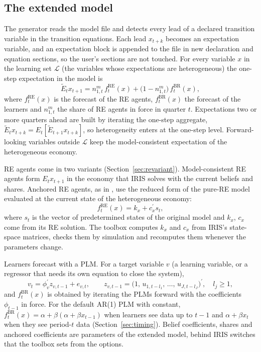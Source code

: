 \documentclass[pdflatex,sn-basic]{sn-jnl}
\DeclareRobustCommand{\code}[1]{\texttt{\detokenize{#1}}}
\newcommand{\RE}{\mathrm{RE}}
\newcommand{\BR}{\mathrm{BR}}
\newcommand{\fRE}{f^{\RE}}
\newcommand{\fBR}{f^{\BR}}
\newcommand{\Eagg}{\tilde{E}}
\newcommand{\transp}{^{\prime}}
\begin{document}
\subsection{The extended model}\label{sec:extended}

The generator reads the model file and detects every lead of a declared transition variable in
the transition equations. Each lead $x_{t+k}$ becomes an expectation variable, and an
expectation block is appended to the file in new declaration and equation sections, so the
user's sections are not touched. For every variable $x$ in the learning set $\mathcal{L}$ (the
variables whose expectations are heterogeneous) the one-step expectation in the model is
\begin{equation}\label{eq:agg}
  \Eagg_t x_{t+1} = n^{m}_{1,t}\,\fRE_t(x) + \bigl(1-n^{m}_{1,t}\bigr)\,\fBR_t(x),
\end{equation}
where $\fRE_t(x)$ is the forecast of the RE agents, $\fBR_t(x)$ the forecast of the learners and
$n^{m}_{1,t}$ the share of RE agents in force in quarter $t$. Expectations two or more quarters
ahead are built by iterating the one-step aggregate, $\Eagg_t x_{t+k} = E_t[\Eagg_{t+1}
x_{t+k}]$, so heterogeneity enters at the one-step level. Forward-looking variables outside
$\mathcal{L}$ keep the model-consistent expectation of the heterogeneous economy.

RE agents come in two variants (Section~\ref{sec:revariant}). Model-consistent RE agents form
$E_t x_{t+1}$ in the economy that IRIS solves with the current beliefs and shares. Anchored RE
agents, as in \citet{ozden2025}, use the reduced form of the pure-RE model evaluated at the
current state of the heterogeneous economy:
\begin{equation}\label{eq:anchored}
  \fRE_t(x) = k_x + c_x\transp s_t ,
\end{equation}
where $s_t$ is the vector of predetermined states of the original model and $k_x$, $c_x$ come
from its RE solution. The toolbox computes $k_x$ and $c_x$ from IRIS's state-space matrices,
checks them by simulation and recomputes them whenever the parameters change.

Learners forecast with a PLM. For a target variable $v$ (a learning variable, or a regressor that
needs its own equation to close the system),
\begin{equation}\label{eq:plm}
  v_t = \phi_v\transp z_{v,t-1} + e_{v,t}, \qquad z_{v,t-1} = \bigl(1,\, u_{1,t-l_1},\, \dots,\, u_{J,t-l_J}\bigr)\transp,\quad l_j\ge 1,
\end{equation}
and $\fBR_t(x)$ is obtained by iterating the PLMs forward with the coefficients $\phi_{t-1}$ in
force. For the default AR(1) PLM with constant, $\fBR_t(x) = \alpha + \beta(\alpha + \beta
x_{t-1})$ when learners see data up to $t-1$ and $\alpha + \beta x_t$ when they see period-$t$
data (Section~\ref{sec:timing}). Belief coefficients, shares and anchored coefficients are
parameters of the extended model, behind IRIS \code{!if} switches that the toolbox sets from the
options.
\end{document}
